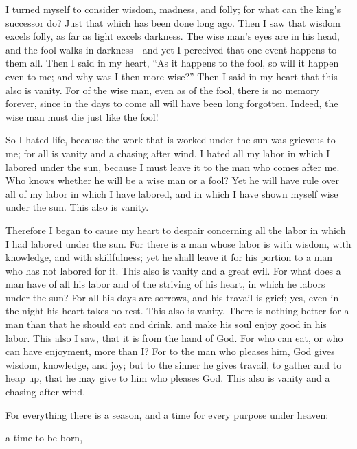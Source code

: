 \myverse{}I turned myself to consider wisdom, madness, and folly; for what
can the king’s successor do? Just that which has been done long ago.
\myverse{}Then I saw that wisdom excels folly, as far as light excels darkness.
\myverse{}The wise man’s eyes are in his head, and the fool walks in darkness—and yet
I perceived that one event happens to them all.
\myverse{}Then I said in my heart, “As it happens to the fool, so will it happen even
to me; and why was I then more wise?” Then I said in my heart that this also is vanity.
\myverse{}For of the wise man, even as of the fool, there is no memory forever, since
in the days to come all will have been long forgotten. Indeed, the wise man must die just like the fool!

\myverse{}So I hated life, because the work that is worked under the sun
was grievous to me; for all is vanity and a chasing after wind.
\myverse{}I hated all my labor in which I labored under the sun, because I must leave
it to the man who comes after me.
\myverse{}Who knows whether he will be a wise man or a fool? Yet he will have rule over
all of my labor in which I have labored, and in which I have shown myself wise under the sun. This also
is vanity.

\myverse{}Therefore I began to cause my heart to despair concerning all
the labor in which I had labored under the sun.
\myverse{}For there is a man whose labor is with wisdom, with knowledge, and with skillfulness;
yet he shall leave it for his portion to a man who has not labored for it. This also is vanity and a great
evil.
\myverse{}For what does a man have of all his labor and of the striving of his heart,
in which he labors under the sun?
\myverse{}For all his days are sorrows, and his travail is grief; yes, even in the night
his heart takes no rest. This also is vanity.
\myverse{}There is nothing better for a man than that he should eat and drink, and make
his soul enjoy good in his labor. This also I saw, that it is from the hand of God.
\myverse{}For who can eat, or who can have enjoyment, more than I?
\myverse{}For to the man who pleases him, God gives wisdom, knowledge, and joy; but
to the sinner he gives travail, to gather and to heap up, that he may give to him who pleases God. This
also is vanity and a chasing after wind.



\mychapter{} \myverse*{}For everything there is a season, and a time for every purpose
under heaven:

\myverse{}a time to be born,

